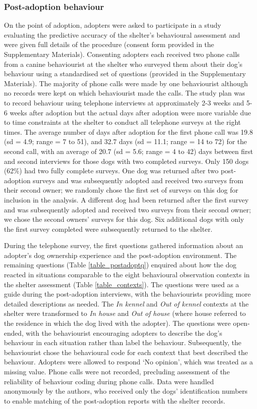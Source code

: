 \documentclass[fleqn,10pt]{wlscirep}
\begin{document}
\subsubsection*{Post-adoption behaviour}
On the point of adoption, adopters were asked to participate in a study evaluating the predictive accuracy of the shelter's behavioural assessment and were given full details of the procedure (consent form provided in the Supplementary Materials). Consenting adopters each received two phone calls from a canine behaviourist at the shelter who surveyed them about their dog's behaviour using a standardised set of questions (provided in the Supplementary Materials). The majority of phone calls were made by one behaviourist although no records were kept on which behaviourist made the calls. The study plan was to record behaviour using telephone interviews at approximately 2-3 weeks and 5-6 weeks after adoption but the actual days after adoption were more variable due to time constraints at the shelter to conduct all telephone surveys at the right times. The average number of days after adoption for the first phone call was 19.8 (sd = 4.9; range = 7 to 51), and 32.7 days (sd = 11.1; range = 14 to 72) for the second call, with an average of 20.7 (sd = 5.6; range = 4 to 42) days between first and second interviews for those dogs with two completed surveys. Only 150 dogs (62\%) had two fully complete surveys. One dog was returned after two post-adoption surveys and was subsequently adopted and received two surveys from their second owner; we randomly chose the first set of surveys on this dog for inclusion in the analysis. A different dog had been returned after the first survey and was subsequently adopted and received two surveys from their second owner; we chose the second owners' surveys for this dog. Six additional dogs with only the first survey completed were subsequently returned to the shelter.

During the telephone survey, the first questions gathered information about an adopter's dog ownership experience and the post-adoption environment. The remaining questions (Table \ref{table_postadoptq}) enquired about how the dog reacted in situations comparable to the eight behavioural observation contexts in the shelter assessment (Table \ref{table_contexts}). The questions were used as a guide during the post-adoption interviews, with the behaviourists providing more detailed descriptions as needed. The \textit{In kennel} and \textit{Out of kennel} contexts at the shelter were transformed to \textit{In house} and \textit{Out of house} (where house referred to the residence in which the dog lived with the adopter). The questions were open-ended, with the behaviourist encouraging adopters to describe the dog's behaviour in each situation rather than label the behaviour. Subsequently, the behaviourist chose the behavioural code for each context that best described the behaviour. Adopters were allowed to respond `No opinion', which was treated as a missing value. Phone calls were not recorded, precluding assessment of the reliability of behaviour coding during phone calls. Data were handled anonymously by the authors, who received only the dogs' identification numbers to enable matching of the post-adoption reports with the shelter records.
\end{document}
